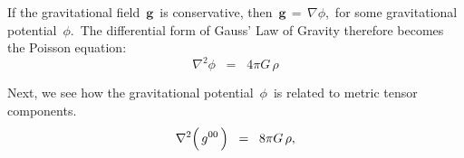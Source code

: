 \vskip 0.3cm
\noindent
If the gravitational field \,$\mathbf{g}$\, is conservative, then
\,$\mathbf{g} \,=\, \nabla \phi$,\,
for some gravitational potential \,$\phi$.\,
The differential form of Gauss' Law of Gravity therefore becomes the Poisson equation:
\begin{equation}\label{eqnPoisson}
\nabla^{2}\phi \;\; = \;\; 4 \pi G \, \rho
\end{equation}


\begin{remark}
\mbox{}
\vskip -0.01cm
\noindent
Next, we see how the gravitational potential \,$\phi$\, is related to metric tensor components.
\begin{equation*}
\nabla^{2}\!\left(\,\overset{{\color{white}.}}{g^{00}}\,\right) \;\; = \;\; 8 \pi G \, \rho,
\end{equation*}
\end{remark}


